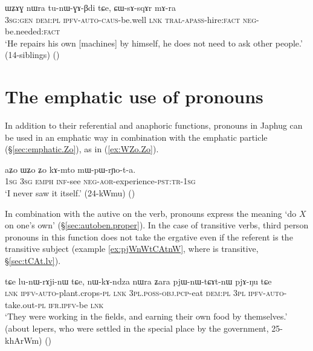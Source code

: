 \begin{exe}
\ex \label{ex:WZAG.nWra}
\gll ɯʑɤɣ nɯra tu-nɯ-ɣɤ-βdi tɕe, ɕɯ-sɤ-sqɤr mɤ-ra \\
\textsc{3sg}:\textsc{gen} \textsc{dem}:\textsc{pl} \textsc{ipfv}-\textsc{auto}-\textsc{caus}-be.well \textsc{lnk} \textsc{tral}-\textsc{apass}-hire:\textsc{fact} \textsc{neg}-be.needed:\textsc{fact} \\
\glt `He repairs his own [machines] by himself, he does not need to ask other people.' (14-siblings) ()
\end{exe} 

\section{The emphatic use of pronouns} \label{sec:pronouns.emph}
In addition to their referential and anaphoric functions, pronouns in Japhug can be used in an emphatic way in combination with the emphatic particle  (§\ref{sec:emphatic.Zo}), as in  (\ref{ex:WZo.Zo}).

\begin{exe}
\ex \label{ex:WZo.Zo}
\gll aʑo ɯʑo ʑo kɤ-mto mɯ-pɯ-rɲo-t-a. \\
\textsc{1sg} \textsc{3sg} \textsc{emph} \textsc{inf}-see \textsc{neg}-\textsc{aor}-experience-\textsc{pst}:\textsc{tr}-\textsc{1sg} \\
\glt `I never saw it itself.' (24-kWmu)
()
\end{exe} 

In combination with the autive  on the verb, pronouns express the meaning `do $X$ on one's own' (§\ref{sec:autoben.proper}). In the case of transitive verbs, third person pronouns in this function does not take the ergative even if the referent is the transitive subject (example \ref{ex:pjWnWtCAtnW}, where  is transitive, §\ref{sec:tCAt.lv}).
 
\begin{exe}
\ex \label{ex:pjWnWtCAtnW}
\gll tɕe lu-nɯ-rɤji-nɯ tɕe, nɯ-kɤ-ndza nɯra ʑara pjɯ-nɯ-tɕɤt-nɯ pjɤ-ŋu tɕe \\
\textsc{lnk} \textsc{ipfv}-\textsc{auto}-plant.crops-\textsc{pl} \textsc{lnk} \textsc{3pl}.\textsc{poss}-\textsc{obj}.\textsc{pcp}-eat \textsc{dem}:\textsc{pl} \textsc{3pl} \textsc{ipfv}-\textsc{auto}-take.out-\textsc{pl} \textsc{ifr}.\textsc{ipfv}-be \textsc{lnk} \\
\glt `They were working in the fields, and earning their own food by themselves.' (about lepers, who were settled in the special place by the government, 25-khArWm)
()
\end{exe} 


